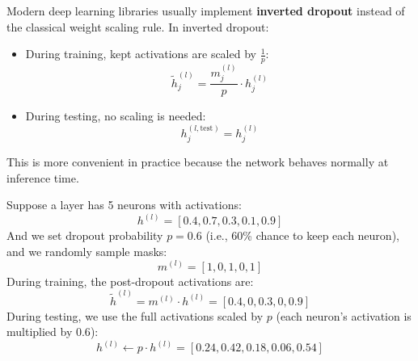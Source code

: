 \begin{remarkbox}
    Modern deep learning libraries usually implement \textbf{inverted dropout} instead of the classical weight scaling rule. In inverted dropout:
    \begin{itemize}
        \item During training, kept activations are scaled by $\frac{1}{p}$:
        \begin{equation*}
            \tilde{h}_j^{(l)} = \dfrac{m_j^{(l)}}{p} \cdot h_j^{(l)}
        \end{equation*}
        \item During testing, no scaling is needed:
        \begin{equation*}
            h_j^{(l,\text{test})} = h_j^{(l)}
        \end{equation*}
    \end{itemize}
    This is more convenient in practice because the network behaves normally at inference time.
\end{remarkbox}

\begin{examplebox}
    Suppose a layer has 5 neurons with activations:
    \begin{equation*}
        h^{(l)} = \left[0.4, 0.7, 0.3, 0.1, 0.9\right]
    \end{equation*}
    And we set dropout probability $p=0.6$ (i.e., 60\% chance to keep each neuron), and we randomly sample masks:
    \begin{equation*}
        m^{(l)} = \left[1, 0, 1, 0, 1\right]
    \end{equation*}
    During training, the post-dropout activations are:
    \begin{equation*}
        \tilde{h}^{(l)} = m^{(l)} \cdot h^{(l)} = \left[0.4, 0, 0.3, 0, 0.9\right]
    \end{equation*}
    During testing, we use the full activations scaled by $p$ (each neuron's activation is multiplied by $0.6$):
    \begin{equation*}
        h^{(l)} \leftarrow p \cdot h^{(l)} = \left[0.24, 0.42, 0.18, 0.06, 0.54\right]
    \end{equation*}
\end{examplebox}